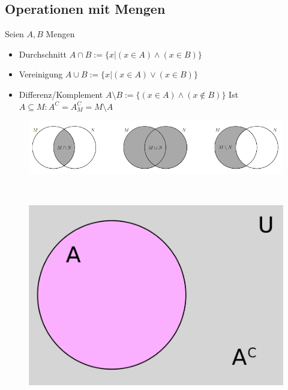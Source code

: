 \documentclass{article}
\begin{document}
        \subsection{Operationen mit Mengen}
            Seien $A,B$ Mengen
            \begin{itemize}
                \item Durchschnitt $A\cap B :=\{x|(x\in A)\land (x\in B)\}$
                \item Vereinigung $A\cup B :=\{x|(x\in A)\lor (x\in B)\}$
                \item Differenz/Komplement $A\setminus B :=\{(x\in A)\land (x \notin B)\}$
                \subitem Ist $A\subseteq M: A^C=A^C_M=M\setminus A $
            \end{itemize}
            \begin{figure}[h]
                \centering
                \includegraphics[width=0.75\linewidth]{./Mengen.png}
                \\
            \end{figure}\\
            \begin{figure}[h]
                \centering
                \includegraphics[width=0.25\linewidth]{./Screenshot from 2023-10-26 12-00-55.png}
            \end{figure}
\end{document}
